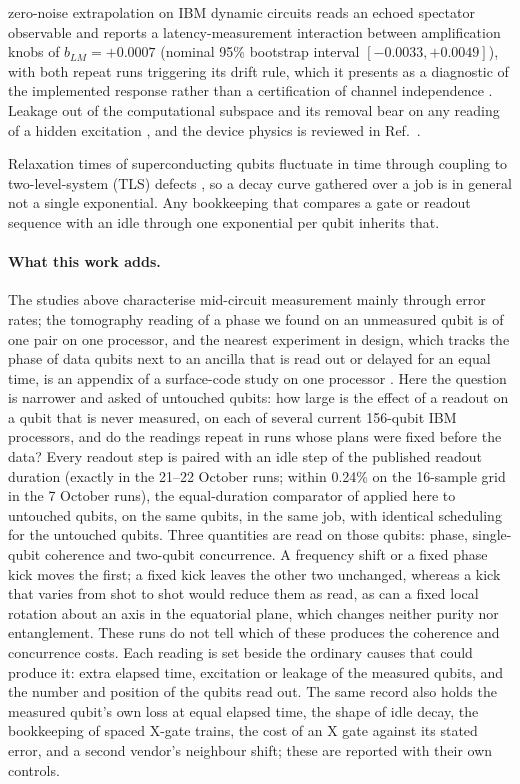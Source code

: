 \documentclass[reprint,amsmath,amssymb,aps,superscriptaddress,nofootinbib]{revtex4-2}
\begin{document}
zero-noise extrapolation on IBM dynamic circuits reads an echoed spectator observable and reports a latency-measurement interaction between amplification knobs of $b_{LM}=+0.0007$ (nominal 95\% bootstrap interval $[-0.0033,+0.0049]$), with both repeat runs triggering its drift rule, which it presents as a diagnostic of the implemented response rather than a certification of channel independence \cite{KumarA2026}. Leakage out of the computational subspace and its removal bear on any reading of a hidden excitation \cite{McEwen2021}, and the device physics is reviewed in Ref.~\cite{Krantz2019}.

Relaxation times of superconducting qubits fluctuate in time through coupling to two-level-system (TLS) defects \cite{Klimov2018,Schlor2019,Burnett2019,Carroll2022,Muller2019}, so a decay curve gathered over a job is in general not a single exponential. Any bookkeeping that compares a gate or readout sequence with an idle through one exponential per qubit inherits that.

\paragraph*{What this work adds.} The studies above characterise mid-circuit measurement mainly through error rates; the tomography reading of a phase we found on an unmeasured qubit is of one pair on one processor, and the nearest experiment in design, which tracks the phase of data qubits next to an ancilla that is read out or delayed for an equal time, is an appendix of a surface-code study on one processor \cite{Kan2026}. Here the question is narrower and asked of untouched qubits: how large is the effect of a readout on a qubit that is never measured, on each of several current 156-qubit IBM processors, and do the readings repeat in runs whose plans were fixed before the data? Every readout step is paired with an idle step of the published readout duration (exactly in the 21--22 October runs; within 0.24\% on the 16-sample grid in the 7 October runs), the equal-duration comparator of \cite{Govia2023} applied here to untouched qubits, on the same qubits, in the same job, with identical scheduling for the untouched qubits. Three quantities are read on those qubits: phase, single-qubit coherence and two-qubit concurrence. A frequency shift or a fixed phase kick moves the first; a fixed kick leaves the other two unchanged, whereas a kick that varies from shot to shot would reduce them as read, as can a fixed local rotation about an axis in the equatorial plane, which changes neither purity nor entanglement. These runs do not tell which of these produces the coherence and concurrence costs. Each reading is set beside the ordinary causes that could produce it: extra elapsed time, excitation or leakage of the measured qubits, and the number and position of the qubits read out. The same record also holds the measured qubit's own loss at equal elapsed time, the shape of idle decay, the bookkeeping of spaced X-gate trains, the cost of an X gate against its stated error, and a second vendor's neighbour shift; these are reported with their own controls.
\end{document}
